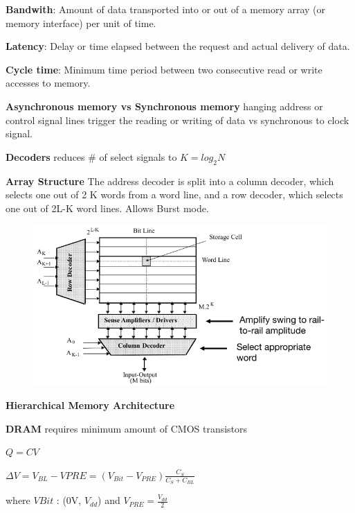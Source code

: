 \documentclass[english]{latex4ei/latex4ei_sheet}
\begin{document}
\textbf{Bandwith}: Amount of data transported into or out of a memory array (or
memory interface) per unit of time.

\textbf{Latency}: Delay or time elapsed between the request and actual delivery of data.

\textbf{Cycle time}: Minimum time period between two consecutive read or write accesses
to memory.

\textbf{Asynchronous memory vs Synchronous memory} hanging address or
control signal lines trigger the reading or writing of data vs synchronous to clock signal.

\textbf{Decoders} reduces \# of select signals to $K = log_2 N$

\textbf{Array Structure} The address decoder is split into a column decoder, which selects one out of 2 K words from a word line, and a row decoder, which selects one out of 2L-K word lines. Allows Burst mode.
\begin{figure}
    \centering
    \includegraphics[width=1\linewidth]{images//5.Memory/ArrayStructure.png}
\end{figure}

\textbf{Hierarchical Memory Architecture}

\textbf{DRAM} requires minimum amount of CMOS transistors

$Q = C V$

$\Delta V = V_{BL} - V{PRE} = (V_{Bit} - V_{PRE})\frac{C_S}{C_S + C_{BL}}$ 

where $V{Bit}$ : (0V, $V_{dd}$) and $V_{PRE} = \frac{V_{dd}}{2}$
\end{document}
